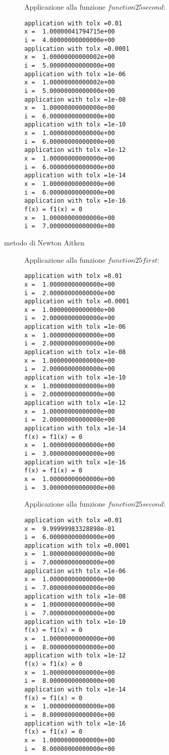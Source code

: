 \begin{description}
Applicazione alla funzione $function25second$:
\begin{lstlisting}
application with tolx =0.01
x =  1.00000041794715e+00
i =  4.00000000000000e+00
application with tolx =0.0001
x =  1.00000000000002e+00
i =  5.00000000000000e+00
application with tolx =1e-06
x =  1.00000000000002e+00
i =  5.00000000000000e+00
application with tolx =1e-08
x =  1.00000000000000e+00
i =  6.00000000000000e+00
application with tolx =1e-10
x =  1.00000000000000e+00
i =  6.00000000000000e+00
application with tolx =1e-12
x =  1.00000000000000e+00
i =  6.00000000000000e+00
application with tolx =1e-14
x =  1.00000000000000e+00
i =  6.00000000000000e+00
application with tolx =1e-16
f(x) = f1(x) = 0
x =  1.00000000000000e+00
i =  7.00000000000000e+00
\end{lstlisting}
\item[metodo di Newton Aitken] Applicazione alla funzione $function25first$:
\begin{lstlisting}
application with tolx =0.01
x =  1.00000000000000e+00
i =  2.00000000000000e+00
application with tolx =0.0001
x =  1.00000000000000e+00
i =  2.00000000000000e+00
application with tolx =1e-06
x =  1.00000000000000e+00
i =  2.00000000000000e+00
application with tolx =1e-08
x =  1.00000000000000e+00
i =  2.00000000000000e+00
application with tolx =1e-10
x =  1.00000000000000e+00
i =  2.00000000000000e+00
application with tolx =1e-12
x =  1.00000000000000e+00
i =  2.00000000000000e+00
application with tolx =1e-14
f(x) = f1(x) = 0
x =  1.00000000000000e+00
i =  3.00000000000000e+00
application with tolx =1e-16
f(x) = f1(x) = 0
x =  1.00000000000000e+00
i =  3.00000000000000e+00
\end{lstlisting}

Applicazione alla funzione $function25second$:
\begin{lstlisting}
application with tolx =0.01
x =  9.99999983328898e-01
i =  6.00000000000000e+00
application with tolx =0.0001
x =  1.00000000000000e+00
i =  7.00000000000000e+00
application with tolx =1e-06
x =  1.00000000000000e+00
i =  7.00000000000000e+00
application with tolx =1e-08
x =  1.00000000000000e+00
i =  7.00000000000000e+00
application with tolx =1e-10
f(x) = f1(x) = 0
x =  1.00000000000000e+00
i =  8.00000000000000e+00
application with tolx =1e-12
f(x) = f1(x) = 0
x =  1.00000000000000e+00
i =  8.00000000000000e+00
application with tolx =1e-14
f(x) = f1(x) = 0
x =  1.00000000000000e+00
i =  8.00000000000000e+00
application with tolx =1e-16
f(x) = f1(x) = 0
x =  1.00000000000000e+00
i =  8.00000000000000e+00
\end{lstlisting}
\end{description}